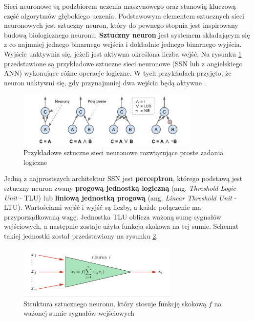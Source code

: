 \documentclass[12pt]{mwbk}
\theoremstyle{plain}
\theoremstyle{definition}
\theoremstyle{remark}
\newcommand\zrodlo[1]{\par\vspace{-3mm}{\small\textit{Źródło: }#1 }}
\begin{document}
Sieci neuronowe są podzbiorem uczenia maszynowego oraz stanowią kluczową część algorytmów głębokiego uczenia. Podstawowym elementem sztucznych sieci neuronowych jest sztuczny neuron, który do pewnego stopnia jest inspirowany budową biologicznego neuronu. \textbf{Sztuczny neuron} jest systemem składającym się z co najmniej jednego binarnego wejścia i dokładnie jednego binarnego wyjścia. Wyjście uaktywnia się, jeżeli jest aktywna określona liczba wejść. Na rysunku \ref{fig:neurony1} przedstawione są przykładowe sztuczne sieci neuronowe (SSN lub z angielskiego ANN) wykonujące różne operacje logiczne. W tych przykładach przyjęto, że neuron uaktywni się, gdy przynajmniej dwa wejścia będą aktywne \cite{geron}.

\begin{figure}[!h]
	\centering
	\includegraphics[width=9cm]{rys/neurony1.png}
	\caption{Przykładowe sztuczne sieci neuronowe rozwiązujące proste zadania logiczne}
	\zrodlo{\cite{geron}}
	\label{fig:neurony1}
\end{figure}

Jedną z najprostszych architektur SSN jest \textbf{perceptron}, którego podstawą jest sztuczny neuron zwany \textbf{progową jednostką logiczną} (ang. \textit{Threshold Logic Unit} - TLU) lub \textbf{liniową jednostką progową} (ang. \textit{Linear Threshold Unit} - LTU). Wartościami wejść i wyjść są liczby, a każde połączenie ma przyporządkowaną wagę. Jednostka TLU oblicza ważoną sumę sygnałów wejściowych, a następnie zostaje użyta funkcja skokowa na tej sumie. Schemat takiej jednostki został przedstawiony na rysunku \ref{fig:neurony2}.

\begin{figure}[!h]
	\centering
	\includegraphics[width=8cm]{rys/neurony2.png}
	\caption{Struktura sztucznego neuronu, który stosuje funkcję skokową $f$ na ważonej sumie sygnałów wejściowych}
	\zrodlo{\cite{ertel}}
	\label{fig:neurony2}
\end{figure}
\end{document}

